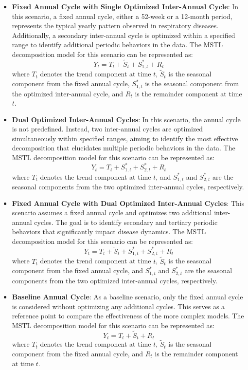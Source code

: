 \documentclass{article}
\begin{document}
\begin{itemize}
  \item \textbf{Fixed Annual Cycle with Single Optimized Inter-Annual Cycle}: 
  In this scenario, a fixed annual cycle, either a 52-week or a 12-month period, represents the typical yearly pattern observed in respiratory diseases. Additionally, a secondary inter-annual cycle is optimized within a specified range to identify additional periodic behaviors in the data. The MSTL decomposition model for this scenario can be represented as:
  \[
  Y_t = T_t + \tilde{S}_{t} + S_{1,t}^* + R_t
  \]
  where \(T_t\) denotes the trend component at time \(t\), \(\tilde{S}_{t}\) is the seasonal component from the fixed annual cycle, \(S_{1,t}^*\) is the seasonal component from the optimized inter-annual cycle, and \(R_t\) is the remainder component at time \(t\).

  \item \textbf{Dual Optimized Inter-Annual Cycles}: 
  In this scenario, the annual cycle is not predefined. Instead, two inter-annual cycles are optimized simultaneously within specified ranges, aiming to identify the most effective decomposition that elucidates multiple periodic behaviors in the data. The MSTL decomposition model for this scenario can be represented as:
  \[
  Y_t = T_t + S_{1,t}^* + S_{2,t}^* + R_t
  \]
  where \(T_t\) denotes the trend component at time \(t\), and \(S_{1,t}^*\) and \(S_{2,t}^*\) are the seasonal components from the two optimized inter-annual cycles, respectively.

  \item \textbf{Fixed Annual Cycle with Dual Optimized Inter-Annual Cycles}: 
  This scenario assumes a fixed annual cycle and optimizes two additional inter-annual cycles. The goal is to identify secondary and tertiary periodic behaviors that significantly impact disease dynamics. The MSTL decomposition model for this scenario can be represented as:
  \[
  Y_t = T_t + \tilde{S}_{t} + S_{1,t}^* + S_{2,t}^* + R_t
  \]
  where \(T_t\) denotes the trend component at time \(t\), \(\tilde{S}_{t}\) is the seasonal component from the fixed annual cycle, and \(S_{1,t}^*\) and \(S_{2,t}^*\) are the seasonal components from the two optimized inter-annual cycles, respectively.

  \item \textbf{Baseline Annual Cycle}: 
  As a baseline scenario, only the fixed annual cycle is considered without optimizing any additional cycles. This serves as a reference point to compare the effectiveness of the more complex models. The MSTL decomposition model for this scenario can be represented as:
  \[
  Y_t = T_t + \tilde{S}_{t} + R_t
  \]
  where \(T_t\) denotes the trend component at time \(t\), \(\tilde{S}_{t}\) is the seasonal component from the fixed annual cycle, and \(R_t\) is the remainder component at time \(t\).
\end{itemize}
\end{document}
